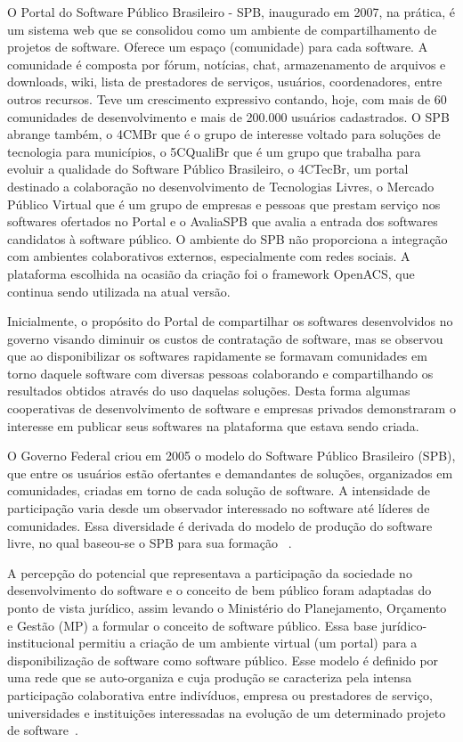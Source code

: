 O Portal do Software Público Brasileiro - SPB, inaugurado em 2007, na prática, é um sistema
web que se consolidou como um ambiente de compartilhamento de projetos de software. Oferece um
espaço (comunidade) para cada software. A comunidade é composta por fórum, notícias, chat, 
armazenamento de arquivos e downloads, wiki, lista de prestadores de serviços, usuários, coordenadores,
entre outros recursos. Teve um crescimento expressivo contando, hoje, com mais de 60 comunidades
de desenvolvimento e mais de 200.000 usuários cadastrados. O SPB abrange também, o 4CMBr que
é o grupo de interesse voltado para soluções de tecnologia para municípios, o 5CQualiBr que é um
grupo que trabalha para evoluir a qualidade do Software Público Brasileiro, o 4CTecBr, um portal
destinado a colaboração no desenvolvimento de Tecnologias Livres, o Mercado Público Virtual que
é um grupo de empresas e pessoas que prestam serviço nos softwares ofertados no Portal e o 
AvaliaSPB que avalia a entrada dos softwares candidatos à software público. O ambiente do SPB não
proporciona a integração com ambientes colaborativos externos, especialmente com redes sociais. A
plataforma escolhida na ocasião da criação foi o framework OpenACS, que continua sendo utilizada
na atual versão.

Inicialmente, o propósito do Portal de compartilhar os softwares desenvolvidos
no governo visando diminuir os custos de contratação de software, mas se observou
que ao disponibilizar os softwares rapidamente se formavam comunidades em torno 
daquele software com diversas pessoas colaborando e compartilhando os resultados
obtidos através do uso daquelas soluções. Desta forma algumas cooperativas de 
desenvolvimento de software e empresas privados demonstraram o interesse em
publicar seus softwares na plataforma que estava sendo criada.

O Governo Federal criou em 2005 o modelo do Software
Público Brasileiro (SPB), que entre os usuários estão ofertantes e demandantes de soluções, 
organizados em comunidades, criadas em torno de cada solução de software. A intensidade de participação
varia desde um observador interessado no software até líderes de comunidades. Essa diversidade é
derivada do modelo de produção do software livre, no qual baseou-se o SPB para sua formação
~\cite{alves2009software}. 

A percepção do potencial que representava a participação da sociedade no desenvolvimento do software
e o conceito de bem público foram adaptadas do ponto de vista jurídico, assim levando o Ministério
do Planejamento, Orçamento e Gestão (MP) a formular o conceito de software público. Essa base
jurídico-institucional permitiu a criação de um ambiente virtual (um portal) para a disponibilização
de software como software público. Esse modelo é definido por uma rede que se auto-organiza e cuja
produção se caracteriza pela intensa participação colaborativa entre indivíduos, empresa ou 
prestadores de serviço, universidades e instituições interessadas na evolução de um determinado projeto
de software~\cite{alves2009software}.

